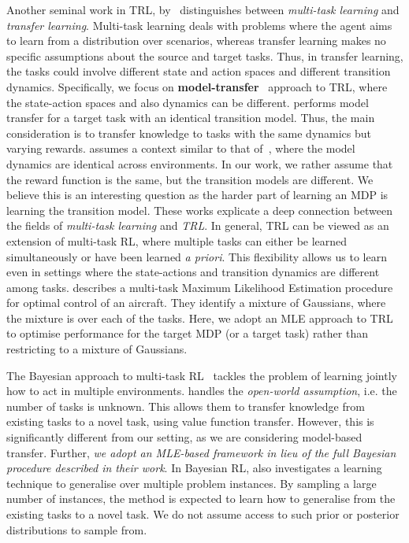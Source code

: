Another seminal work in TRL, by~\citep{taylor2009transfer} distinguishes between \emph{multi-task learning} and \emph{transfer learning}. Multi-task learning deals with problems where the agent aims to learn from a distribution over scenarios, whereas transfer learning makes no specific assumptions about the source and target tasks. Thus, in transfer learning, the tasks could involve different state and action spaces and different transition dynamics. Specifically, we focus on \textbf{model-transfer}~\citep{atkeson1997comparison} approach to TRL, where the state-action spaces and also dynamics can be different. \citep{atkeson1997comparison} performs model transfer for a target task with an identical transition model. Thus, the main consideration is to transfer knowledge to tasks with the same dynamics but varying rewards. \citep{laroche2017transfer} assumes a context similar to that of~\citep{atkeson1997comparison}, where the model dynamics are identical across environments. In our work, we rather assume that the reward function is the same, but the transition models are different. We believe this is an interesting question as the harder part of learning an MDP is learning the transition model. 
These works explicate a deep connection between the fields of \emph{multi-task learning} and \emph{TRL}. In general, TRL can be viewed as an extension of multi-task RL, where multiple tasks can either be learned simultaneously or have been learned \textit{a priori}. This flexibility allows us to learn even in settings where the state-actions and transition dynamics are different among tasks. \citep{rommel2017aircraft} describes a multi-task Maximum Likelihood Estimation procedure for optimal control of an aircraft. They identify a mixture of Gaussians, where the mixture is over each of the tasks. Here, we adopt an MLE approach to TRL to optimise performance for the target MDP (or a target task) rather than restricting to a mixture of Gaussians.

The Bayesian approach to multi-task RL~\citep{wilson2007multi, lazaric2010bayesian} tackles the problem of learning jointly how to act in multiple environments. \citep{lazaric2010bayesian} handles the \emph{open-world assumption}, i.e. the number of tasks is unknown. This allows them to transfer knowledge from existing tasks to a novel task, using value function transfer. However, this is significantly different from our setting, as we are considering model-based transfer. Further, \textit{we adopt an MLE-based framework in lieu of the full Bayesian procedure described in their work}.
In Bayesian RL, \citep{tamar2022regularization} also investigates a learning technique to generalise over multiple problem instances. By sampling a large number of instances, the method is expected to learn how to generalise from the existing tasks to a novel task. We do not assume access to such prior or posterior distributions to sample from.

